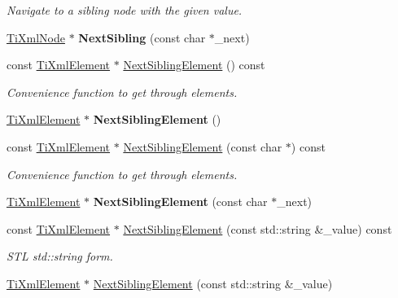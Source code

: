 \begin{DoxyCompactItemize}
\begin{DoxyCompactList}\small\item\em Navigate to a sibling node with the given \textquotesingle{}value\textquotesingle{}. \end{DoxyCompactList}\item 
\hyperlink{class_ti_xml_node}{Ti\+Xml\+Node} $\ast$ {\bfseries Next\+Sibling} (const char $\ast$\+\_\+next)\hypertarget{class_ti_xml_node_a4080bc5cc8a5c139e7cf308669e850fc}{}\label{class_ti_xml_node_a4080bc5cc8a5c139e7cf308669e850fc}

\item 
const \hyperlink{class_ti_xml_element}{Ti\+Xml\+Element} $\ast$ \hyperlink{class_ti_xml_node_a7667217e269e0da01d1f82aee94d1a3d}{Next\+Sibling\+Element} () const 
\begin{DoxyCompactList}\small\item\em Convenience function to get through elements. \end{DoxyCompactList}\item 
\hyperlink{class_ti_xml_element}{Ti\+Xml\+Element} $\ast$ {\bfseries Next\+Sibling\+Element} ()\hypertarget{class_ti_xml_node_a1b211cb5034655a04358e0e2f6fc5010}{}\label{class_ti_xml_node_a1b211cb5034655a04358e0e2f6fc5010}

\item 
const \hyperlink{class_ti_xml_element}{Ti\+Xml\+Element} $\ast$ \hyperlink{class_ti_xml_node_a3d7897999f99cf4870dd59df6331d7ff}{Next\+Sibling\+Element} (const char $\ast$) const 
\begin{DoxyCompactList}\small\item\em Convenience function to get through elements. \end{DoxyCompactList}\item 
\hyperlink{class_ti_xml_element}{Ti\+Xml\+Element} $\ast$ {\bfseries Next\+Sibling\+Element} (const char $\ast$\+\_\+next)\hypertarget{class_ti_xml_node_a6e1ac6b800e18049bc75e9f8e63a8e5f}{}\label{class_ti_xml_node_a6e1ac6b800e18049bc75e9f8e63a8e5f}

\item 
const \hyperlink{class_ti_xml_element}{Ti\+Xml\+Element} $\ast$ \hyperlink{class_ti_xml_node_a7572d0af9d1e696ee3f05d8bb5ebb463}{Next\+Sibling\+Element} (const std\+::string \&\+\_\+value) const \hypertarget{class_ti_xml_node_a7572d0af9d1e696ee3f05d8bb5ebb463}{}\label{class_ti_xml_node_a7572d0af9d1e696ee3f05d8bb5ebb463}

\begin{DoxyCompactList}\small\item\em S\+TL std\+::string form. \end{DoxyCompactList}\item 
\hyperlink{class_ti_xml_element}{Ti\+Xml\+Element} $\ast$ \hyperlink{class_ti_xml_node_a506958e34406729a4e4c5326ea39d081}{Next\+Sibling\+Element} (const std\+::string \&\+\_\+value)\hypertarget{class_ti_xml_node_a506958e34406729a4e4c5326ea39d081}{}\label{class_ti_xml_node_a506958e34406729a4e4c5326ea39d081}


\end{DoxyCompactItemize}
